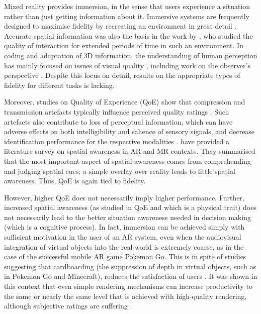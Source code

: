 \documentclass[11pt,english]{nik}
\begin{document}
Mixed reality provides immersion, in the sense that users experience a situation rather than just getting information about it. Immersive systems are frequently designed to maximise fidelity by recreating an environment in great detail \autocite{Muhanna-2015,lentzVirtualRealitySystem2007}.
Accurate spatial information was also the basis in the work by \citet{DBLP:conf/si3d/SteedSHAS03}, who studied the quality of interaction for extended periods of time in such an environment. 
In coding and adaptation of 3D information, the understanding of human perception has mainly focused on issues of visual quality \autocite{DBLP:conf/mmsp/SmolicMMRKEW04}, including work on the observer's perspective \autocite{wu-etal-2011,Gulliver-Ghinea-2006}. 
Despite this focus on detail, results on the appropriate types of fidelity for different tasks is lacking.

Moreover, studies on Quality of Experience (QoE) show that compression and transmission artefacts typically influence perceived quality ratings \autocite{MuMu-Interview-2009,Goldmann-etal-2010}.
Such artefacts also contribute to loss of perceptual information, which can have adverse effects on both intelligibility and salience of sensory signals, and decrease identification performance for the respective modalities \autocite{jordanEffectsHorizontalViewing2001}. 
\citet{zhangQualityAlternateReality2017} have provided a literature survey on spatial awareness in AR and MR contexts. 
They summarised that the most important aspect of spatial awareness comes from comprehending and judging spatial cues; a simple overlay over reality leads to little spatial awareness. 
Thus, QoE is again tied to fidelity.

However, higher QoE does not necessarily imply higher performance. Further, increased spatial awareness (as studied in QoE and which is a physical trait) does not necessarily lead to the better situation awareness needed in decision making (which is a cognitive process).
In fact, immersion can be achieved simply with sufficient motivation in the user of an AR system, even when the audiovisual integration of virtual objects into the real world is extremely coarse, as in the case of the successful mobile AR game Pokemon Go. 
This is in spite of studies suggesting that cardboarding (the suppression of depth in virtual objects, such as in Pokemon Go and Minecraft), reduces the satisfaction of users \autocite{DBLP:conf/apgv/ChapiroDPOSG14}. 
It was shown in this context that even simple rendering mechanisms can increase productivity to the same or nearly the same level that is achieved with high-quality rendering, although subjective ratings are suffering \autocite{DBLP:conf/qomex/SchatzRSSK18}.
\end{document}
